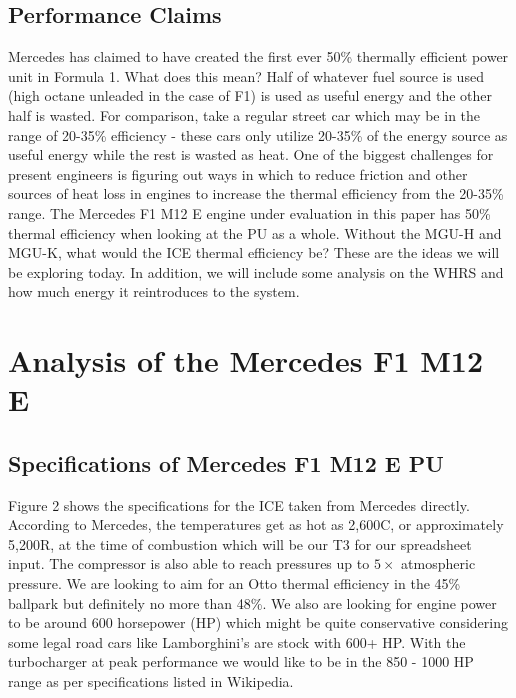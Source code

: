 \documentclass{article}
\begin{document}
\subsection{Performance Claims}
Mercedes has claimed to have created the first ever 50\% thermally efficient power unit in Formula 1\cite{fiftypercentTE}. What does this mean? Half of whatever fuel source is used (high octane unleaded in the case of F1) is used as useful energy and the other half is wasted. For comparison, take a regular street car which may be in the range of 20-35\% efficiency - these cars only utilize 20-35\% of the energy source as useful energy while the rest is wasted as heat. One of the biggest challenges for present engineers is figuring out ways in which to reduce friction and other sources of heat loss in engines to increase the thermal efficiency from the 20-35\% range. The Mercedes F1 M12 E engine under evaluation in this paper has 50\% thermal efficiency when looking at the PU as a whole. Without the MGU-H and MGU-K, what would the ICE thermal efficiency be? These are the ideas we will be exploring today. In addition, we will include some analysis on the WHRS and how much energy it reintroduces to the system. 
\section{Analysis of the Mercedes F1 M12 E}
\subsection{Specifications of Mercedes F1 M12 E PU}
Figure 2 shows the specifications for the ICE taken from Mercedes directly\cite{Eperformance}. According to Mercedes, the temperatures get as hot as 2,600C, or approximately 5,200R, at the time of combustion which will be our T3 for our spreadsheet input. The compressor is also able to reach pressures up to $5\times$ atmospheric pressure\cite{F1engineFacts}. We are looking to aim for an Otto thermal efficiency in the 45\% ballpark but definitely no more than 48\%. We also are looking for engine power to be around 600 horsepower (HP) which might be quite conservative considering some legal road cars like Lamborghini's are stock with 600+ HP. With the turbocharger at peak performance we would like to be in the 850 - 1000 HP range as per specifications listed in Wikipedia\cite{F1History}. 
\end{document}
